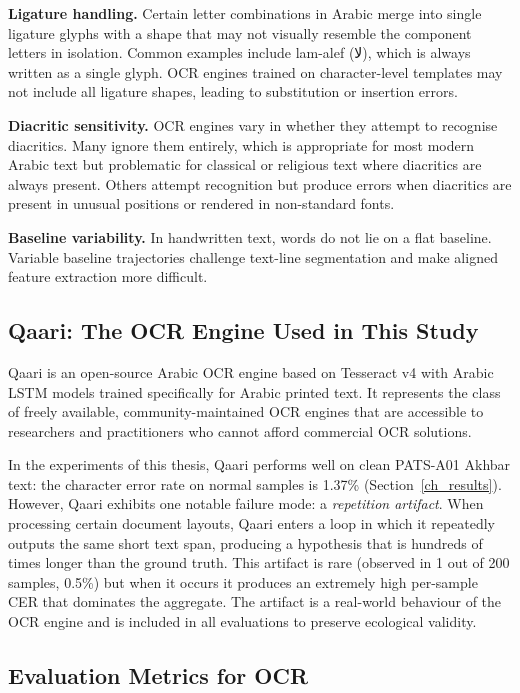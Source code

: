 \textbf{Ligature handling.}
Certain letter combinations in Arabic merge into single ligature glyphs with
a shape that may not visually resemble the component letters in isolation.
Common examples include lam-alef (\textarabic{لا}), which is always written as
a single glyph.
OCR engines trained on character-level templates may not include all ligature
shapes, leading to substitution or insertion errors.

\textbf{Diacritic sensitivity.}
OCR engines vary in whether they attempt to recognise diacritics.
Many ignore them entirely, which is appropriate for most modern Arabic text
but problematic for classical or religious text where diacritics are always
present.
Others attempt recognition but produce errors when diacritics are present in
unusual positions or rendered in non-standard fonts.

\textbf{Baseline variability.}
In handwritten text, words do not lie on a flat baseline.
Variable baseline trajectories challenge text-line segmentation and make
aligned feature extraction more difficult.

\subsection{Qaari: The OCR Engine Used in This Study}
\label{subsec:qaari}

Qaari is an open-source Arabic OCR engine based on Tesseract v4 with Arabic
LSTM models trained specifically for Arabic printed text.
It represents the class of freely available, community-maintained OCR engines
that are accessible to researchers and practitioners who cannot afford commercial
OCR solutions.

In the experiments of this thesis, Qaari performs well on clean PATS-A01 Akhbar
text: the character error rate on normal samples is 1.37\% (Section~\ref{ch_results}).
However, Qaari exhibits one notable failure mode: a \emph{repetition artifact}.
When processing certain document layouts, Qaari enters a loop in which it
repeatedly outputs the same short text span, producing a hypothesis that is
hundreds of times longer than the ground truth.
This artifact is rare (observed in 1 out of 200 samples, 0.5\%) but when it
occurs it produces an extremely high per-sample CER that dominates the aggregate.
The artifact is a real-world behaviour of the OCR engine and is included in all
evaluations to preserve ecological validity.

\subsection{Evaluation Metrics for OCR}
\label{subsec:ocr_metrics}

